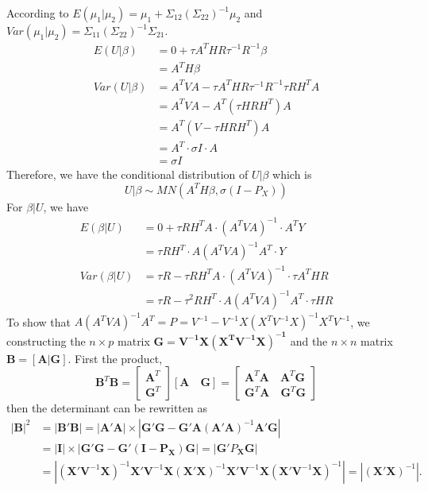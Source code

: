 \documentclass[12pt]{article}
\begin{document}
    According to $E(\mu_1|\mu_2)=\mu_1+\Sigma_{12}(\Sigma_{22})^{-1}\mu_2$ and $Var(\mu_1|\mu_2)=\Sigma_{11}(\Sigma_{22})^{-1}\Sigma_{21}$.\\
    \begin{align*}
        E(U|\beta)&=0+\tau A^THR\tau^{-1}R^{-1}\beta\\
        &=A^TH\beta\\
        Var(U|\beta)&=A^TVA-\tau A^THR\tau^{-1}R^{-1}\tau RH^TA\\
        &=A^TVA-A^T(\tau HRH^T)A\\
        &=A^T(V-\tau HRH^T)A\\
        &=A^T\cdot \sigma I\cdot A\\
        &=\sigma I
    \end{align*}
    Therefore, we have the conditional distribution of $U|\beta$ which is
    \begin{equation*}
    U|\beta\sim MN(A^TH\beta,\sigma(I-P_X))
    \end{equation*}
    For $\beta|U$, we have
    \begin{align*}
        E(\beta|U)&=0+\tau RH^TA\cdot(A^TVA)^{-1}\cdot A^TY\\
        &=\tau RH^T\cdot A(A^TVA)^{-1}A^T\cdot Y\\
        Var(\beta|U)&=\tau R-\tau RH^TA\cdot(A^TVA)^{-1}\cdot \tau A^THR\\
        &=\tau R-\tau^2 RH^T\cdot A(A^TVA)^{-1}A^T\cdot \tau HR
    \end{align*}
    To show that $A(A^TVA)^{-1}A^T=P=V^{-1}-V^{-1}X(X^TV^{-1}X)^{-1}X^TV^{-1}$, we constructing the $n\times p$ matrix $\mathbf{G=V^{-1}X(X^TV^{-1}X)^{-1}}$ and the $n\times n$ matrix $\mathbf{B=[A|G]}$. First the product,
    \begin{equation*}
    \textbf{B}^T\textbf{B}=\begin{bmatrix}
        \textbf{A}^T\\
        \textbf{G}^T
        \end{bmatrix}
        [\mathbf{A}\quad \mathbf{G}]=\begin{bmatrix}
        \mathbf{A}^T\mathbf{A} \quad \mathbf{A}^T\mathbf{G}\\
        \mathbf{G}^T\mathbf{A} \quad \mathbf{G}^T\mathbf{G}
        \end{bmatrix}
    \end{equation*}
    then the determinant can be rewritten as
    \begin{equation*}
    \begin{split}
    |\textbf{B}|^2&=|\textbf{B}'\textbf{B}|=|\mathbf{A}'\mathbf{A}|\times|\mathbf{G}'\mathbf{G}-\mathbf{G}'\mathbf{A}(\mathbf{A}'\mathbf{A})^{-1}\mathbf{A}'\mathbf{G}|\\
    &=|\textbf{I}|\times|\mathbf{G}'\mathbf{G}-\mathbf{G}'(\mathbf{I-P_X})\mathbf{G}|=|\mathbf{G}'P_\mathbf{X}\mathbf{G}|\\
    &=|(\mathbf{X}'\mathbf{V}^{-1}\mathbf{X})^{-1}\mathbf{X}'\mathbf{V}^{-1}\mathbf{X}(\mathbf{X}'\mathbf{X})^{-1}\mathbf{X}'\mathbf{V}^{-1}\mathbf{X}(\mathbf{X}'\mathbf{V}^{-1}\mathbf{X})^{-1}|=|(\mathbf{X}'\mathbf{X})^{-1}|.
    \end{split}
    \end{equation*}
\end{document}
